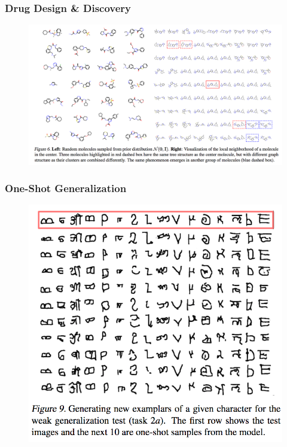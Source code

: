 \documentclass[10pt,mathserif]{beamer}
\begin{document}
\begin{frame}
  \frametitle{Drug Design \& Discovery}
\begin{figure}[ht]
  \centering
  \includegraphics[width=0.6\paperwidth]{figure/vae_molecule}
\end{figure}
\end{frame}

\begin{frame}
  \frametitle{One-Shot Generalization}
\begin{figure}[ht]
  \centering
  \includegraphics[width=0.6\paperwidth]{figure/vae_omniglot}
\end{figure}
\end{frame}
\end{document}
